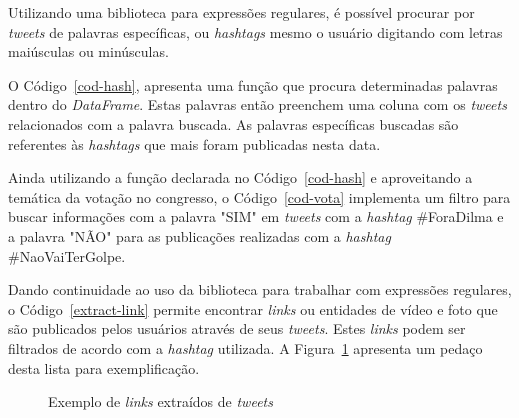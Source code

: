 Utilizando uma biblioteca para expressões regulares, é possível procurar por \textit{tweets} de palavras específicas, ou \textit{hashtags} mesmo o usuário digitando com letras maiúsculas ou minúsculas.

O Código~\ref{cod-hash}, apresenta uma função que procura determinadas palavras dentro do \textit{DataFrame}. Estas palavras então preenchem uma coluna com os \textit{tweets} relacionados com a palavra buscada. As palavras específicas buscadas são referentes às \textit{hashtags} que mais foram publicadas nesta data.



Ainda utilizando a função declarada no Código~\ref{cod-hash} e aproveitando a temática da votação no congresso, o Código~\ref{cod-vota} implementa um filtro para buscar informações com a palavra "SIM" \space em \textit{tweets} com a \textit{hashtag} \#ForaDilma e a palavra "NÃO" \space para as publicações realizadas com a \textit{hashtag} \#NaoVaiTerGolpe.



Dando continuidade ao uso da biblioteca para trabalhar com expressões regulares, o Código~\ref{extract-link} permite encontrar \textit{links} ou entidades de vídeo e foto que são publicados pelos usuários através de seus \textit{tweets}. Estes \textit{links} podem ser filtrados de acordo com a \textit{hashtag} utilizada. A Figura~\ref{links} apresenta um pedaço desta lista para exemplificação.

\begin{figure}[h]
	\centering
	\caption{Exemplo de \textit{links} extraídos de \textit{tweets}}
	\vspace{-0.3cm}
	\label{links}
\end{figure}


